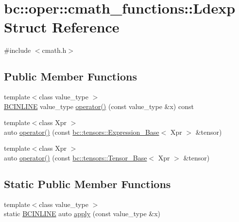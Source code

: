 \hypertarget{structbc_1_1oper_1_1cmath__functions_1_1Ldexp}{}\section{bc\+:\+:oper\+:\+:cmath\+\_\+functions\+:\+:Ldexp Struct Reference}
\label{structbc_1_1oper_1_1cmath__functions_1_1Ldexp}


{\ttfamily \#include $<$cmath.\+h$>$}

\subsection*{Public Member Functions}
\begin{DoxyCompactItemize}
\item 
{\footnotesize template$<$class value\+\_\+type $>$ }\\\hyperlink{common_8h_a6699e8b0449da5c0fafb878e59c1d4b1}{B\+C\+I\+N\+L\+I\+NE} value\+\_\+type \hyperlink{structbc_1_1oper_1_1cmath__functions_1_1Ldexp_a1374620cbb92096e6751657f5899ea8c}{operator()} (const value\+\_\+type \&x) const
\item 
{\footnotesize template$<$class Xpr $>$ }\\auto \hyperlink{structbc_1_1oper_1_1cmath__functions_1_1Ldexp_adea82cf404b98ecbb06187f9a4841cea}{operator()} (const \hyperlink{classbc_1_1tensors_1_1Expression__Base}{bc\+::tensors\+::\+Expression\+\_\+\+Base}$<$ Xpr $>$ \&tensor)
\item 
{\footnotesize template$<$class Xpr $>$ }\\auto \hyperlink{structbc_1_1oper_1_1cmath__functions_1_1Ldexp_ad5cbefc8f4e2945e253598329f30911a}{operator()} (const \hyperlink{classbc_1_1tensors_1_1Tensor__Base}{bc\+::tensors\+::\+Tensor\+\_\+\+Base}$<$ Xpr $>$ \&tensor)
\end{DoxyCompactItemize}
\subsection*{Static Public Member Functions}
\begin{DoxyCompactItemize}
\item 
{\footnotesize template$<$class value\+\_\+type $>$ }\\static \hyperlink{common_8h_a6699e8b0449da5c0fafb878e59c1d4b1}{B\+C\+I\+N\+L\+I\+NE} auto \hyperlink{structbc_1_1oper_1_1cmath__functions_1_1Ldexp_a4fd0a2ade9f8d32291421397da4f1ac5}{apply} (const value\+\_\+type \&x)
\end{DoxyCompactItemize}



